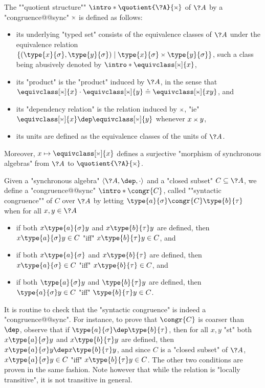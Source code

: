 The \AP""quotient structure"" $\intro*\quotient{\?A}{\asympbar}$
of $\?A$ by a "congruence@@sync" $\asympbar$ is defined as follows:
\begin{itemize}
	\item its underlying "typed set" consists of the
		equivalence classes of $\?A$ under the equivalence relation
		$\{(\type{x}{\sigma}, \type{y}{\sigma}) \mid \type{x}{\sigma} \asympbar \type{y}{\sigma}\}$,
		such a class being abusively denoted by \AP$\intro*\equivclass[\asympbar]{x}$,
	\item its "product" is the "product" induced by $\?A$, in the sense
		that $\equivclass[\asympbar]{x}\cdot \equivclass[\asympbar]{y} \defeq \equivclass[\asympbar]{xy}$, and
	\item its "dependency relation" is the relation induced by $\asympbar$,
		"ie" $\equivclass[\asympbar]{x}\dep \equivclass[\asympbar]{y}$ whenever $x \asympbar y$,
	\item its units are defined as the equivalence classes of the units of $\?A$.
\end{itemize}
Moreover, $x \mapsto \equivclass[\asympbar]{x}$ defines a surjective
"morphism of synchronous algebras" from $\?A$ to $\quotient{\?A}{\asympbar}$.

Given a "synchronous algebra" $\langle \?A, \dep, \cdot \rangle$
and a "closed subset" $C \subseteq \?A$, 
we define a "congruence@@sync" \AP$\intro*\congr{C}$, called
\AP""syntactic congruence"" of $C$ over $\?A$ by letting
$\type{a}{\sigma} \congr{C} \type{b}{\tau}$ when for all $x, y \in \?A$
\begin{itemize}
	\item if both
		$x \type{a}{\sigma} y$
		and $x \type{b}{\tau} y$ are defined,
		then $x \type{a}{\sigma} y \in C$
		"iff" $x \type{b}{\tau} y \in C$, and
	\item if both
		$x \type{a}{\sigma}$
		and $x \type{b}{\tau}$ are defined,
		then $x \type{a}{\sigma} \in C$
		"iff" $x \type{b}{\tau} \in C$, and
	\item if both $\type{a}{\sigma} y$
		and $\type{b}{\tau} y$ are defined,
		then $\type{a}{\sigma} y \in C$
		"iff" $\type{b}{\tau} y \in C$.
\end{itemize}
It is routine to check that the "syntactic congruence" is indeed a "congruence@@sync".
For instance, to prove that $\congr{C}$ is coarser than $\dep$, observe that
if $\type{a}{\sigma} \dep \type{b}{\tau}$, then
for all $x, y$ "st" both $x \type{a}{\sigma} y$
and $x \type{b}{\tau} y$ are defined, then $x \type{a}{\sigma} y \dep x \type{b}{\tau} y$,
and since $C$ is a "closed subset" of $\?A$, $x \type{a}{\sigma} y \in C$ "iff"
$x \type{b}{\tau} y \in C$. The other two conditions are proven in the same fashion.
Note however that while the relation is "locally transitive", it is not
transitive in general.

